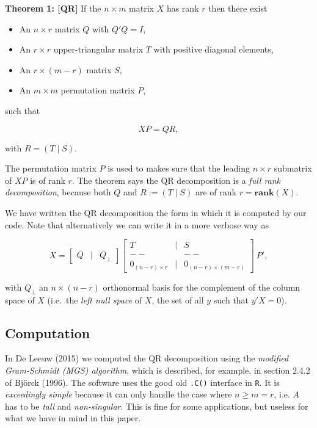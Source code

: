 \documentclass[12pt,]{article}
\providecommand{\tightlist}{%
  \setlength{\itemsep}{0pt}\setlength{\parskip}{0pt}}
\begin{document}
\textbf{Theorem 1: {[}QR{]}} If the \(n\times m\) matrix \(X\) has rank
\(r\) then there exist

\begin{itemize}
\tightlist
\item
  An \(n\times r\) matrix \(Q\) with \(Q'Q=I\),
\item
  An \(r\times r\) upper-triangular matrix \(T\) with positive diagonal
  elements,
\item
  An \(r\times(m-r)\) matrix \(S\),
\item
  An \(m\times m\) permutation matrix \(P\),
\end{itemize}

such that

\begin{equation}
XP=QR,\label{E:qr}
\end{equation}

with \(R=(T\mid S)\).

The permutation matrix \(P\) is used to makes sure that the leading
\(n\times r\) submatrix of \(XP\) is of rank \(r\). The theorem says the
QR decomposition is a \emph{full rank decomposition}, because both \(Q\)
and \(R:=(T \mid S)\) are of rank \(r=\mathbf{rank}(X)\).

We have written the QR decomposition the form in which it is computed by
our code. Note that alternatively we can write it in a more verbose way
as

\begin{equation}
X=\begin{bmatrix}Q&\mid&Q_\perp\end{bmatrix}\begin{bmatrix}T&\mid&S\\--&&--\\0_{(n-r)\times r}&\mid&0_{(n-r)\times(m-r)}\end{bmatrix}\ P',\label{E:qr2}
\end{equation}

with \(Q_\perp\) an \(n\times(n-r)\) orthonormal basis for the
complement of the column space of \(X\) (i.e.~the \emph{left null space}
of \(X\), the set of all \(y\) such that \(y'X=0\)).

\subsection{Computation}\label{computation}

In De Leeuw (2015) we computed the QR decomposition using the
\emph{modified Gram-Schmidt (MGS) algorithm}, which is described, for
example, in section 2.4.2 of Björck (1996). The software uses the good
old \texttt{.C()} interface in \texttt{R}. It is \emph{exceedingly
simple} because it can only handle the case where \(n\geq m=r\), i.e.
\(A\) has to be \emph{tall} and \emph{non-singular}. This is fine for
some applications, but useless for what we have in mind in this paper.
\end{document}

